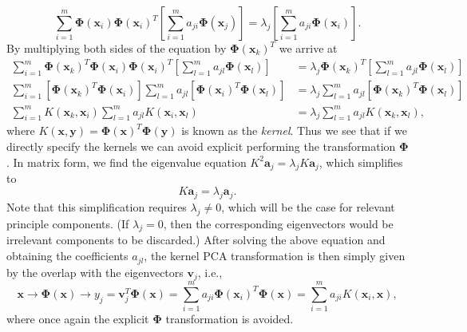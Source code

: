\begin{equation}
    \sum_{i=1}^{m} \bm{\Phi}(\bm{x}_{i})\bm{\Phi}(\bm{x}_{i})^T \left[ \sum_{i=1}^{m} a_{ji}\bm{\Phi}(\bm{x}_{j}) \right] = \lambda_{j} \left[ \sum_{i=1}^{m} a_{ji}\bm{\Phi}(\bm{x}_{i}) \right].
\end{equation}
By multiplying both sides of the equation by $\bm{\Phi}(\bm{x}_{k})^{T}$ we arrive at
\begin{equation}\label{eqn: kernel pca eigen equation}
    \begin{split}
        \sum_{i=1}^{m} \bm{\Phi}(\bm{x}_{k})^{T} \bm{\Phi}(\bm{x}_{i})\bm{\Phi}(\bm{x}_{i})^T \left[ \sum_{l=1}^{m} a_{jl}\bm{\Phi}(\bm{x}_{l}) \right] &= \lambda_{j} \bm{\Phi}(\bm{x}_{k})^{T} \left[ \sum_{l=1}^{m} a_{jl} \bm{\Phi}(\bm{x}_{l}) \right] \\
        \sum_{i=1}^{m} \left[ \bm{\Phi}(\bm{x}_{k})^{T} \bm{\Phi}(\bm{x}_{i}) \right]   \sum_{l=1}^{m} a_{jl} \left[ \bm{\Phi}(\bm{x}_{i})^T \bm{\Phi}(\bm{x}_{l}) \right] &= \lambda_{j} \sum_{l=1}^{m} a_{jl} \left[ \bm{\Phi}(\bm{x}_{k})^{T} \bm{\Phi}(\bm{x}_{l}) \right] \\
        \sum_{i=1}^{m} K(\bm{x}_{k},\bm{x}_{i})   \sum_{l=1}^{m} a_{jl} K(\bm{x}_{i},\bm{x}_{l}) &= \lambda_{j} \sum_{l=1}^{m} a_{jl} K(\bm{x}_{k},\bm{x}_{l}), 
    \end{split}
\end{equation}
where $K(\bm{x},\bm{y}) = \bm{\Phi}(\bm{x})^{T} \bm{\Phi}(\bm{y})$ is known as the \textit{kernel}. Thus we see that if we directly specify the kernels we can avoid explicit performing the transformation $\bm{\Phi}$. In matrix form, we find the eigenvalue equation $K^{2}\bm{a}_{j} = \lambda_{j} K \bm{a}_{j}$, which simplifies to
\begin{equation}
    K \bm{a}_{j} = \lambda_{j} \bm{a}_{j}.
\end{equation}
Note that this simplification requires $\lambda_j \neq 0$, which will be the case for relevant principle components. (If $\lambda_{j} = 0$, then the corresponding eigenvectors would be irrelevant components to be discarded.) 
After solving the above equation and obtaining the coefficients $a_{jl}$, the kernel PCA transformation is then simply given by the overlap with the eigenvectors $\bm{v}_{j}$, i.e.,%
\begin{equation}
    \bm{x} \rightarrow \bm{\Phi}(\bm{x}) \rightarrow y_{j} = \bm{v}_{j}^{T}\bm{\Phi}(\bm{x}) = \sum_{i=1}^{m} a_{ji} \bm{\Phi}(\bm{x}_{i})^{T} \bm{\Phi}(\bm{x}) = \sum_{i=1}^{m} a_{ji} K(\bm{x}_{i},\bm{x}),
\end{equation}
where once again the explicit $\bm{\Phi}$ transformation is avoided.

